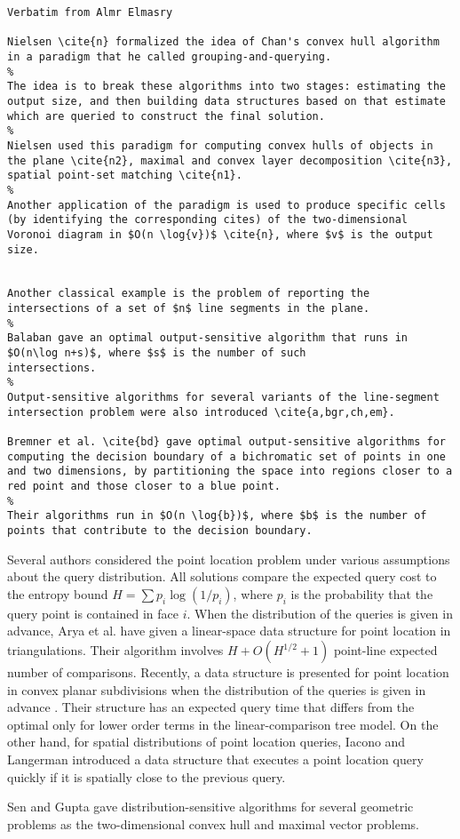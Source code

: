 \begin{verbatim}
Verbatim from Almr Elmasry

Nielsen \cite{n} formalized the idea of Chan's convex hull algorithm
in a paradigm that he called grouping-and-querying.  
%
The idea is to break these algorithms into two stages: estimating the
output size, and then building data structures based on that estimate
which are queried to construct the final solution.  
%
Nielsen used this paradigm for computing convex hulls of objects in
the plane \cite{n2}, maximal and convex layer decomposition \cite{n3},
spatial point-set matching \cite{n1}. 
%
Another application of the paradigm is used to produce specific cells
(by identifying the corresponding cites) of the two-dimensional
Voronoi diagram in $O(n \log{v})$ \cite{n}, where $v$ is the output
size.


Another classical example is the problem of reporting the
intersections of a set of $n$ line segments in the plane. 
%
Balaban gave an optimal output-sensitive algorithm that runs in $O(n\log n+s)$, where $s$ is the number of such
intersections. 
%
Output-sensitive algorithms for several variants of the line-segment
intersection problem were also introduced \cite{a,bgr,ch,em}.

Bremner et al. \cite{bd} gave optimal output-sensitive algorithms for
computing the decision boundary of a bichromatic set of points in one
and two dimensions, by partitioning the space into regions closer to a
red point and those closer to a blue point. 
%
Their algorithms run in $O(n \log{b})$, where $b$ is the number of
points that contribute to the decision boundary.
\end{verbatim}

\begin{DISTRIBUTIONSENSITIVE}
  Several authors considered the point location problem under various
  assumptions about the query distribution.
%
  All solutions compare the expected query cost to the entropy bound
  $H=\sum p_i \log{(1/p_i)}$, where $p_i$ is the probability that the
  query point is contained in face $i$.
%
  When the distribution of the queries is given in advance, Arya et
  al. \cite{ar} have given a linear-space data structure for point
  location in triangulations.
%
  Their algorithm involves $H+O(H^{1/2}+1)$ point-line expected number
  of comparisons.
%
  Recently, a data structure is presented for point location in convex
  planar subdivisions when the distribution of the queries is given in
  advance \cite{co}.
%
  Their structure has an expected query time that differs from the
  optimal only for lower order terms in the linear-comparison tree
  model.
%
  On the other hand, for spatial distributions of point location
  queries, Iacono and Langerman \cite{il2} introduced a data structure
  that executes a point location query quickly if it is spatially
  close to the previous query.

  Sen and Gupta \cite{sg} gave distribution-sensitive algorithms for
  several geometric problems as the two-dimensional convex hull and
  maximal vector problems.
\end{DISTRIBUTIONSENSITIVE}



